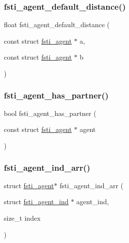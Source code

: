 \subsubsection{\texorpdfstring{fsti\+\_\+agent\+\_\+default\+\_\+distance()}{fsti\_agent\_default\_distance()}}
{\footnotesize\ttfamily float fsti\+\_\+agent\+\_\+default\+\_\+distance (\begin{DoxyParamCaption}\item[{const struct \mbox{\hyperlink{structfsti__agent}{fsti\+\_\+agent}} $\ast$}]{a,  }\item[{const struct \mbox{\hyperlink{structfsti__agent}{fsti\+\_\+agent}} $\ast$}]{b }\end{DoxyParamCaption})}

\mbox{\label{fsti-agent_8c_ac3681ff2f8616442d578a983ec0c17ea}} 
\subsubsection{\texorpdfstring{fsti\+\_\+agent\+\_\+has\+\_\+partner()}{fsti\_agent\_has\_partner()}}
{\footnotesize\ttfamily bool fsti\+\_\+agent\+\_\+has\+\_\+partner (\begin{DoxyParamCaption}\item[{const struct \mbox{\hyperlink{structfsti__agent}{fsti\+\_\+agent}} $\ast$}]{agent }\end{DoxyParamCaption})}

\mbox{\label{fsti-agent_8c_a0e45e82b7f4f019b1813daf04717b894}} 
\subsubsection{\texorpdfstring{fsti\+\_\+agent\+\_\+ind\+\_\+arr()}{fsti\_agent\_ind\_arr()}}
{\footnotesize\ttfamily struct \mbox{\hyperlink{structfsti__agent}{fsti\+\_\+agent}}$\ast$ fsti\+\_\+agent\+\_\+ind\+\_\+arr (\begin{DoxyParamCaption}\item[{struct \mbox{\hyperlink{structfsti__agent__ind}{fsti\+\_\+agent\+\_\+ind}} $\ast$}]{agent\+\_\+ind,  }\item[{size\+\_\+t}]{index }\end{DoxyParamCaption})}

